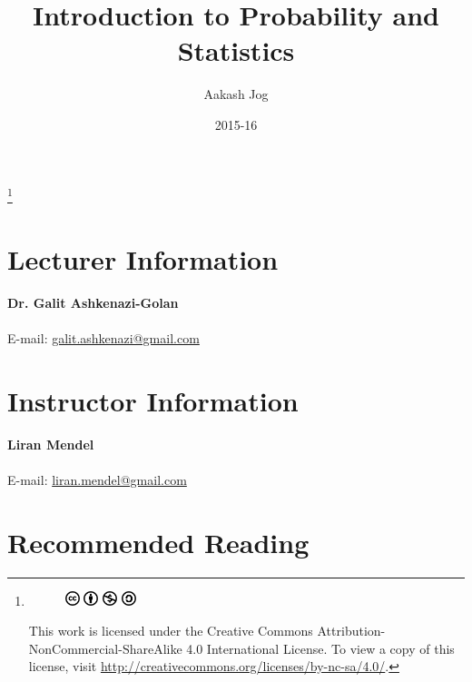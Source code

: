 \documentclass[titlepage, fleqn, a4paper, 12pt, twoside]{article}
\title{Introduction to Probability and Statistics}
\author{Aakash Jog}
\date{2015-16}
\theoremstyle{definition}
\theoremstyle{theorem}
\newcommand\blfootnote[1]{%
	\begingroup
	\renewcommand\thefootnote{}\footnote{#1}%
	\addtocounter{footnote}{-1}%
	\endgroup
}
\begin{document}
\begin{titlepage}
\maketitle
\end{titlepage}
\restoregeometry

\blfootnote
{
	\begin{figure}[H]
		\includegraphics[height = 12pt]{cc.pdf}
		\includegraphics[height = 12pt]{by.pdf}
		\includegraphics[height = 12pt]{nc.pdf}
		\includegraphics[height = 12pt]{sa.pdf}
	\end{figure}
	This work is licensed under the Creative Commons Attribution-NonCommercial-ShareAlike 4.0 International License. To view a copy of this license, visit \url{http://creativecommons.org/licenses/by-nc-sa/4.0/}.
} %

\tableofcontents

\clearpage
\section{Lecturer Information}

\textbf{Dr. Galit Ashkenazi-Golan}\\
~\\
E-mail: \href{mailto:galit.ashkenazi@gmail.com}{galit.ashkenazi@gmail.com}\\

\section{Instructor Information}

\textbf{Liran Mendel}\\
~\\
E-mail: \href{mailto:liran.mendel@gmail.com}{liran.mendel@gmail.com}\\

\section{Recommended Reading}
\end{document}
